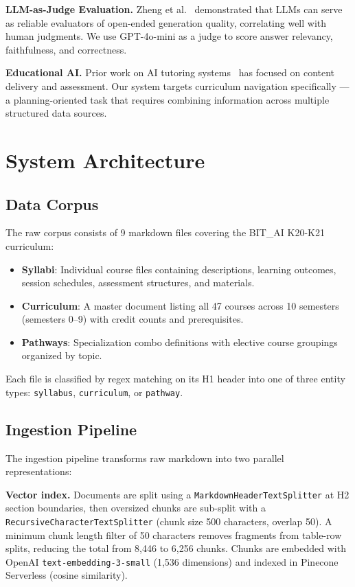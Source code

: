 \documentclass[lettersize,journal]{IEEEtran}
\begin{document}
\textbf{LLM-as-Judge Evaluation.} Zheng et al.~\cite{ref_llm_judge} demonstrated that LLMs can serve as reliable evaluators of open-ended generation quality, correlating well with human judgments. We use GPT-4o-mini as a judge to score answer relevancy, faithfulness, and correctness.

\textbf{Educational AI.} Prior work on AI tutoring systems~\cite{ref_edu_ai} has focused on content delivery and assessment. Our system targets curriculum navigation specifically --- a planning-oriented task that requires combining information across multiple structured data sources.

\section{System Architecture}

\subsection{Data Corpus}

The raw corpus consists of 9 markdown files covering the BIT\_AI K20-K21 curriculum:
\begin{itemize}
    \item \textbf{Syllabi}: Individual course files containing descriptions, learning outcomes, session schedules, assessment structures, and materials.
    \item \textbf{Curriculum}: A master document listing all 47 courses across 10 semesters (semesters 0--9) with credit counts and prerequisites.
    \item \textbf{Pathways}: Specialization combo definitions with elective course groupings organized by topic.
\end{itemize}

Each file is classified by regex matching on its H1 header into one of three entity types: \texttt{syllabus}, \texttt{curriculum}, or \texttt{pathway}.

\subsection{Ingestion Pipeline}

The ingestion pipeline transforms raw markdown into two parallel representations:

\textbf{Vector index.} Documents are split using a \texttt{MarkdownHeaderTextSplitter} at H2 section boundaries, then oversized chunks are sub-split with a \texttt{RecursiveCharacterTextSplitter} (chunk size 500 characters, overlap 50). A minimum chunk length filter of 50 characters removes fragments from table-row splits, reducing the total from 8{,}446 to 6{,}256 chunks. Chunks are embedded with OpenAI \texttt{text-embedding-3-small} (1{,}536 dimensions) and indexed in Pinecone Serverless (cosine similarity).
\end{document}

